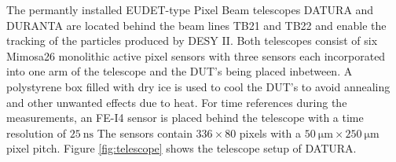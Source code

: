 The permantly installed EUDET-type Pixel Beam telescopes DATURA and DURANTA are located behind the beam lines TB21 and TB22 and enable the tracking of the particles
produced by DESY II. Both telescopes consist of six Mimosa26 monolithic active pixel sensors with %
three sensors each incorporated into one arm of the telescope and the DUT's being placed inbetween. A polystyrene box filled with dry ice is used to cool the DUT's to
avoid annealing and other unwanted effects due to heat. For time references during the measurements, an FE-I4 sensor is placed behind the telescope with a
time resolution of $\SI{25}{\nano\second}$ The sensors contain $336 \times 80$ pixels with a
$\SI{50}{\micro\meter} \times \SI{250}{\micro\meter}$ pixel pitch. Figure \ref{fig:telescope} shows the telescope setup of DATURA.


